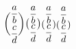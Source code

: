 $
\displaystyle {\binom{\displaystyle{a\over b}}{\displaystyle{c\over d}}}
\textstyle {\binom{\displaystyle{a\over b}}{\displaystyle{c\over d}}}
\scriptstyle {\binom{\displaystyle{a\over b}}{\displaystyle{c\over d}}}
\scriptscriptstyle {\binom{\displaystyle{a\over b}}{\displaystyle{c\over d}}}
$
